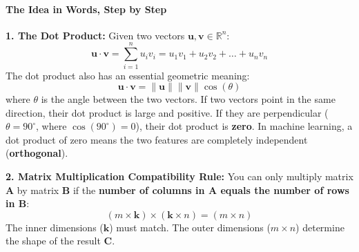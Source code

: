 \paragraph{The Idea in Words, Step by Step}
\textbf{1. The Dot Product:}
Given two vectors $\mathbf{u}, \mathbf{v} \in \mathbb{R}^n$:
\begin{equation}
\mathbf{u} \cdot \mathbf{v} = \sum_{i=1}^n u_i v_i = u_1 v_1 + u_2 v_2 + \dots + u_n v_n\label{eq:dot_product}
\end{equation}
The dot product also has an essential geometric meaning:
\begin{equation}
\mathbf{u} \cdot \mathbf{v} = \|\mathbf{u}\| \|\mathbf{v}\| \cos(\theta)\label{eq:dot_cosine}
\end{equation}
where $\theta$ is the angle between the two vectors. If two vectors point in the same direction, their dot product is large and positive. If they are perpendicular ($\theta = 90^\circ$, where $\cos(90^\circ) = 0$), their dot product is \textbf{zero}. In machine learning, a dot product of zero means the two features are completely independent (\textbf{orthogonal}).

\textbf{2. Matrix Multiplication Compatibility Rule:}
You can only multiply matrix $\mathbf{A}$ by matrix $\mathbf{B}$ if the \textbf{number of columns in $\mathbf{A}$ equals the number of rows in $\mathbf{B}$}:
\begin{equation}
(m \times \mathbf{k}) \times (\mathbf{k} \times n) = (m \times n)
\end{equation}
The inner dimensions ($\mathbf{k}$) must match. The outer dimensions ($m \times n$) determine the shape of the result $\mathbf{C}$.

